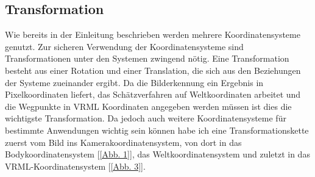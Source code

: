 \subsection{Transformation}
\label{sec_transformations}
Wie bereits in der Einleitung beschrieben werden mehrere Koordinatensysteme genutzt. Zur sicheren Verwendung der Koordinatensysteme sind Transformationen unter den Systemen zwingend nötig.
Eine Transformation besteht aus einer Rotation und einer Translation, die sich aus den Beziehungen der Systeme zueinander ergibt.
Da die Bilderkennung ein Ergebnis in Pixelkoordinaten liefert, das Schätzverfahren auf Weltkoordinaten arbeitet und die Wegpunkte in VRML Koordinaten angegeben werden müssen ist dies die wichtigste Transformation. Da jedoch auch weitere Koordinatensysteme für bestimmte Anwendungen wichtig sein können habe ich eine Transformationskette zuerst vom Bild ins Kamerakoordinatensystem, von dort in das Bodykoordinatensystem [\ref{Abb. 1}], das Weltkoordinatensystem und zuletzt in das VRML-Koordinatensystem [\ref{Abb. 3}].\\

\begin{lstlisting}[language=Matlab]

\end{lstlisting}
